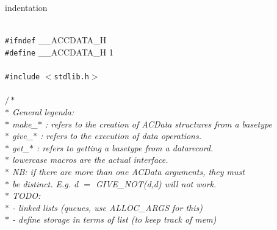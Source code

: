 %
%
\setlength{\textwidth}{15cm}
\setlength{\textheight}{22.5cm}
\setlength{\hoffset}{-2cm}
\setlength{\voffset}{-2cm}
\cfoot{\rm\thepage}
\addtolength{\headheight}{14pt}
\pagestyle{fancy}

\expandafter\ifx\csname indentation\endcsname\relax%
\newlength{\indentation}\fi
\setlength{\indentation}{0.5em}
\begin{flushleft}
\mbox{}\\
{\tt \#ifndef} \_\_ACCDATA\_H \mbox{}\\
{\tt \#define} \_\_ACCDATA\_H 1\mbox{}\\
\mbox{}\\
{\tt \#include} $<${\tt{}stdlib.h}$>$\mbox{}\\
\mbox{}\\
{$/\ast$\it{}\mbox{}\\
\hspace*{1\indentation}$\ast$ General legenda:\mbox{}\\
\hspace*{1\indentation}$\ast$ make\_$\ast$  : refers to the creation of ACData structures from a basetype\mbox{}\\
\hspace*{1\indentation}$\ast$ give\_$\ast$  : refers to the execution of data operations.\mbox{}\\
\hspace*{1\indentation}$\ast$ get\_$\ast$   : refers to getting a basetype from a datarecord.\mbox{}\\
\hspace*{1\indentation}$\ast$ lowercase macros are the actual interface.\mbox{}\\
\hspace*{1\indentation}$\ast$ NB: if there are more than one ACData arguments, they must\mbox{}\\
\hspace*{1\indentation}$\ast$ be distinct. E.g. d $=$ GIVE\_NOT(d,d) will not work.\mbox{}\\
\hspace*{1\indentation}$\ast$ TODO:\mbox{}\\
\hspace*{1\indentation}$\ast$ - linked lists (queues, use ALLOC\_ARGS for this)\mbox{}\\
\hspace*{1\indentation}$\ast$ - define storage in terms of list (to keep track of mem)\mbox{}\\
}
\end{flushleft}
